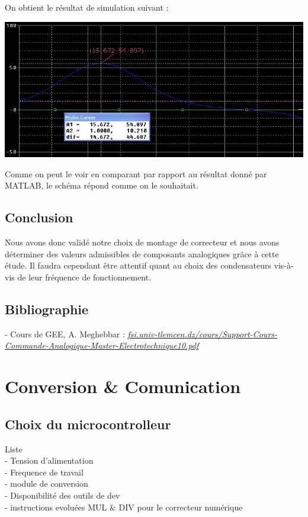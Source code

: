 \documentclass[11pt, french]{article} %
\begin{document}
On obtient le résultat de simulation suivant : 

\begin{center}
\includegraphics[width = 15cm]{SolutionAnalogique/simuAvph.png} 
\end{center}

Comme on peut le voir en comparant par rapport au résultat donné par MATLAB, le schéma répond comme on le souhaitait. 

\vspace{0.5cm}
\subsection{Conclusion}

\noindent
Nous avons donc validé notre choix de montage de correcteur et nous avons déterminer des valeurs admissibles de composants analogiques grâce à cette étude. Il faudra cependant être attentif quant au choix des condensateurs vis-à-vis de leur fréquence de fonctionnement.  

\subsection{Bibliographie}

- Cours de GEE, A. Meghebbar :
\newline \textit{\underline{fsi.univ-tlemcen.dz/cours/Support-Cours-Commande-Analogique-Master-Electrotechnique10.pdf}}


\section{Conversion \& Comunication}
\subsection{Choix du microcontrolleur}
Liste
\\- Tension d'alimentation
\\- Frequence de travail
\\- module de conversion
\\- Disponibilité des outils de dev
\\- instructions evoluées MUL \& DIV pour le correcteur numérique
\end{document}
